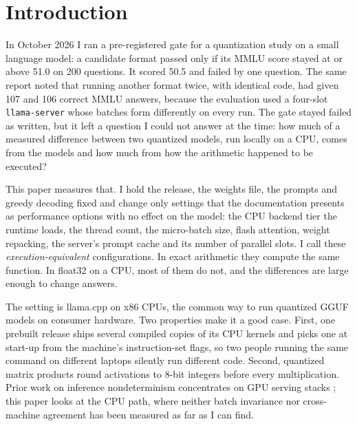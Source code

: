 \section{Introduction}
\label{sec:intro}

In October 2026 I ran a pre-registered gate for a quantization study on a small language model:
a candidate format passed only if its MMLU score stayed at or above 51.0 on 200 questions. It
scored 50.5 and failed by one question. The same report noted that running another format twice,
with identical code, had given 107 and 106 correct MMLU answers, because the evaluation used a
four-slot \texttt{llama-server} whose batches form differently on every run. The gate stayed
failed as written, but it left a question I could not answer at the time: how much of a
measured difference between two quantized models, run locally on a CPU, comes from the models
and how much from how the arithmetic happened to be executed?

This paper measures that. I hold the release, the weights file, the prompts and greedy decoding
fixed and change only settings that the documentation presents as performance options with no
effect on the model: the CPU backend tier the runtime loads, the thread count, the micro-batch
size, flash attention, weight repacking, the server's prompt cache and its number of parallel
slots. I call these \emph{execution-equivalent} configurations. In exact arithmetic they compute
the same function. In float32 on a CPU, most of them do not, and the differences are large
enough to change answers.

The setting is llama.cpp on x86 CPUs, the common way to run quantized GGUF models on consumer
hardware. Two properties make it a good case. First, one prebuilt release ships several
compiled copies of its CPU kernels and picks one at start-up from the machine's instruction-set
flags, so two people running the same command on different laptops silently run different
code. Second, quantized matrix products round activations to 8-bit integers before every
multiplication. Prior work on inference nondeterminism concentrates on GPU serving stacks
\citep{he2025,yuan2025,gond2026,zhao2026,cooper2026}; this paper looks at the CPU path, where
neither batch invariance nor cross-machine agreement has been measured as far as I can find.


